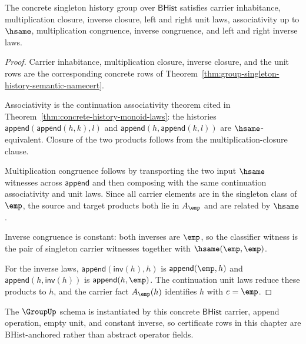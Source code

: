 \begin{theorem}
\label{thm:concrete-singleton-history-group-laws}
The concrete singleton history group over $\mathsf{BHist}$ satisfies carrier
inhabitance, multiplication closure, inverse closure, left and right unit laws,
associativity up to $\hsame$, multiplication congruence, inverse congruence,
and left and right inverse laws.
\end{theorem}
\begin{proof}
Carrier inhabitance, multiplication closure, inverse closure, and the unit rows
are the corresponding concrete rows of
Theorem~\ref{thm:group-singleton-history-semantic-namecert}.

Associativity is the continuation associativity theorem cited in
Theorem~\ref{thm:concrete-history-monoid-laws}: the histories
$\mathsf{append}(\mathsf{append}(h,k),l)$ and
$\mathsf{append}(h,\mathsf{append}(k,l))$ are $\hsame$-equivalent. Closure of
the two products follows from the multiplication-closure clause.

Multiplication congruence follows by transporting the two input $\hsame$
witnesses across $\mathsf{append}$ and then composing with the same
continuation associativity and unit laws. Since all carrier elements are in
the singleton class of $\emp$, the source and target products both lie in
$A_{\emp}$ and are related by $\hsame$.

Inverse congruence is constant: both inverses are $\emp$, so the classifier
witness is the pair of singleton carrier witnesses together with
$\hsame(\emp,\emp)$.

For the inverse laws, $\mathsf{append}(\mathsf{inv}(h),h)$ is
$\mathsf{append}(\emp,h)$ and $\mathsf{append}(h,\mathsf{inv}(h))$ is
$\mathsf{append}(h,\emp)$. The continuation unit laws reduce these products to
$h$, and the carrier fact $A_{\emp}(h)$ identifies $h$ with $e=\emp$.
\end{proof}

The $\GroupUp$ schema is instantiated by this concrete $\mathsf{BHist}$ carrier,
append operation, empty unit, and constant inverse, so certificate rows in this
chapter are BHist-anchored rather than abstract operator fields.

